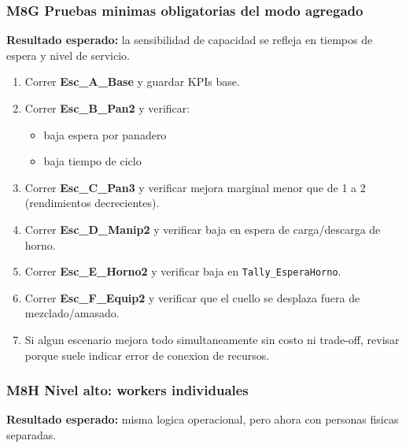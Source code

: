 \documentclass[11pt]{article}
\newcommand{\simio}[1]{\texttt{#1}}
\begin{document}
\subsubsection{M8G Pruebas minimas obligatorias del modo agregado}
\textbf{Resultado esperado:} la sensibilidad de capacidad se refleja en tiempos de espera y nivel de servicio.

\begin{enumerate}
  \item Correr \textbf{Esc\_A\_Base} y guardar KPIs base.
  \item Correr \textbf{Esc\_B\_Pan2} y verificar:
  \begin{itemize}
    \item baja espera por panadero
    \item baja tiempo de ciclo
  \end{itemize}
  \item Correr \textbf{Esc\_C\_Pan3} y verificar mejora marginal menor que de 1 a 2 (rendimientos decrecientes).
  \item Correr \textbf{Esc\_D\_Manip2} y verificar baja en espera de carga/descarga de horno.
  \item Correr \textbf{Esc\_E\_Horno2} y verificar baja en \simio{Tally\_EsperaHorno}.
  \item Correr \textbf{Esc\_F\_Equip2} y verificar que el cuello se desplaza fuera de mezclado/amasado.
  \item Si algun escenario mejora todo simultaneamente sin costo ni trade-off, revisar porque suele indicar error de conexion de recursos.
\end{enumerate}

\subsubsection{M8H Nivel alto: workers individuales}
\textbf{Resultado esperado:} misma logica operacional, pero ahora con personas fisicas separadas.
\end{document}
